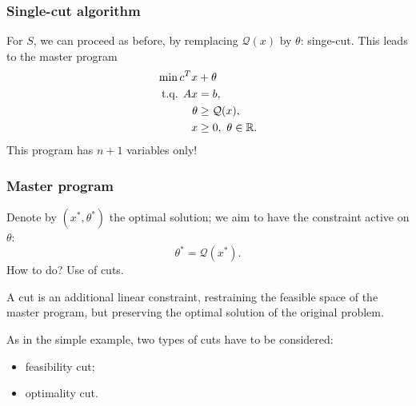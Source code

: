\documentclass{beamer}
\begin{document}
\begin{frame}
\frametitle{Single-cut algorithm}
	
For $S$, we can proceed as before, by remplacing $\mathcal{Q}(x)$ by $\theta$: singe-cut.
This leads to the {\red master program}
\begin{align*}
	\min c^Tx & + \theta \\
	\mbox{t.q. } Ax & = b, \\
	\theta &\geq \mathcal{Q}(x),\\
	x & \geq 0,\ \theta \in \mathbb{R}.
\end{align*}
This program has $n+1$ variables only!



\end{frame}

\begin{frame}
\frametitle{Master program}
	
Denote by $(x^*, \theta^*)$ the optimal solution; we aim to have the constraint active on $\theta$:
\[
\theta^* = \mathcal{Q}(x^*).
\]
How to do? Use of cuts.
	
\mbox{}

A cut is an additional linear constraint, restraining the feasible space of the master program, but preserving the optimal solution of the original problem.
	
\mbox{}
	
As in the simple example, two types of cuts have to be considered:
\begin{itemize}
\item
\mbox{\red feasibility} cut;
\item
\mbox{\red optimality} cut.
\end{itemize}
	
\end{frame}
\end{document}
